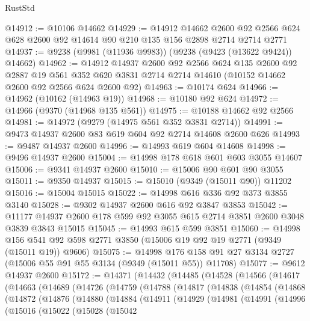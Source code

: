 \begin{lexlean}{RustStd}
\begin{coremodule}
{\begin{coremodule}
{{{{{{{{{{{{{{{{{{{{{{{{{{{{{{{{{{{{{{{@14912 := @10106 @14662
@14929 := @14912
    @14662
    @2600
    @92
    @2566
    @624
    @628
    @2600
    @92
    @14614
    @90
    @210
    @135
    @156
    @2898
    @2714
    @2714
    @2771
@14937 := @9238 (@9981 (@11936 @9983)) (@9238 (@9423 (@13622 @9424)) @14662)
@14962 := @14912
    @14937
    @2600
    @92
    @2566
    @624
    @135
    @2600
    @92
    @2887
    @19
    @561
    @352
    @620
    @3831
    @2714
    @2714
    @14610
    (@10152 @14662 @2600 @92 @2566 @624 @2600 @92)
@14963 := @10174 @624
@14966 := @14962 (@10162 (@14963 @19))
@14968 := @10180 @92 @624
@14972 := @14966 (@9370 (@14968 @135 @561))
@14975 := @10188 @14662 @92 @2566
@14981 := @14972 (@9279 (@14975 @561 @352 @3831 @2714))
@14991 := @9473 @14937 @2600 @83 @619 @604 @92 @2714 @14608 @2600 @626
@14993 := @9487 @14937 @2600
@14996 := @14993 @619 @604 @14608
@14998 := @9496 @14937 @2600
@15004 := @14998 @178 @618 @601 @603 @3055 @14607
@15006 := @9341 @14937 @2600
@15010 := @15006 @90 @601 @90 @3055
@15011 := @9350 @14937
@15015 := @15010 (@9349 (@15011 @90)) @11202
@15016 := @15004 @15015
@15022 := @14998 @616 @336 @92 @373 @3855 @3140
@15028 := @9302 @14937 @2600 @616 @92 @3847 @3853
@15042 := @11177 @14937 @2600 @178 @599 @92 @3055 @615 @2714 @3851 @2600 @3048 @3839 @3843 @15015
@15045 := @14993 @615 @599 @3851
@15060 := @14998
    @156
    @541
    @92
    @598
    @2771
    @3850
    (@15006 @19 @92 @19 @2771 (@9349 (@15011 @19)) @9606)
@15075 := @14998
    @176
    @158
    @91
    @27
    @3134
    @2727
    (@15006 @55 @91 @55 @3134 (@9349 (@15011 @55)) @11708)
@15077 := @9612 @14937 @2600
@15172 := @14371
    (@14432
      (@14485
        (@14528
          (@14566
            (@14617
              (@14663
                (@14689
                  (@14726
                    (@14759
                      (@14788
                        (@14817
                          (@14838
                            (@14854
                              (@14868
                                (@14872
                                  (@14876
                                    (@14880
                                      (@14884
                                        (@14911
                                          (@14929
                                            (@14981
                                              (@14991
                                                (@14996
                                                  (@15016
                                                    (@15022
                                                      (@15028
                                                        (@15042
}}}}}}}}}}}}}}}}}}}}}}}}}}}}}}}}}}}}}}}
\end{coremodule}}
\end{coremodule}
\end{lexlean}
